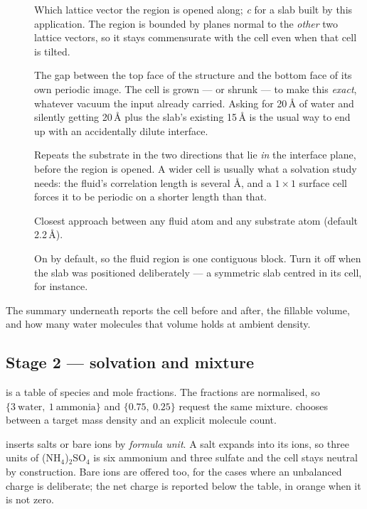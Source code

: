 \begin{description}
  \item[] Which lattice vector the region is opened
    along; \emph{c} for a slab built by this application. The region is
    bounded by planes normal to the \emph{other} two lattice vectors, so it
    stays commensurate with the cell even when that cell is tilted.
  \item[] The gap between the top face of the structure
    and the bottom face of its own periodic image. The cell is grown --- or
    shrunk --- to make this \emph{exact}, whatever vacuum the input already
    carried. Asking for 20\,\AA{} of water and silently getting 20\,\AA{}
    plus the slab's existing 15\,\AA{} is the usual way to end up with an
    accidentally dilute interface.
  \item[] Repeats the substrate in the two directions
    that lie \emph{in} the interface plane, before the region is opened. A
    wider cell is usually what a solvation study needs: the fluid's
    correlation length is several \AA{}, and a $1\times1$ surface cell forces
    it to be periodic on a shorter length than that.
  \item[] Closest approach between any fluid atom and
    any substrate atom (default 2.2\,\AA{}).
  \item[] On by default, so
    the fluid region is one contiguous block. Turn it off when the slab was
    positioned deliberately --- a symmetric slab centred in its cell, for
    instance.
\end{description}

The summary underneath reports the cell before and after, the fillable
volume, and how many water molecules that volume holds at ambient density.

\subsection{Stage 2 --- solvation and mixture}

 is a table of species and mole fractions. The
fractions are normalised, so $\{3\ \text{water},\ 1\ \text{ammonia}\}$ and
$\{0.75,\ 0.25\}$ request the same mixture.  chooses between a
target mass density and an explicit molecule count.

 inserts salts or bare ions by \emph{formula unit}. A salt
expands into its ions, so three units of (NH$_4$)$_2$SO$_4$ is six ammonium
and three sulfate and the cell stays neutral by construction. Bare ions are
offered too, for the cases where an unbalanced charge is deliberate; the net
charge is reported below the table, in orange when it is not zero.

